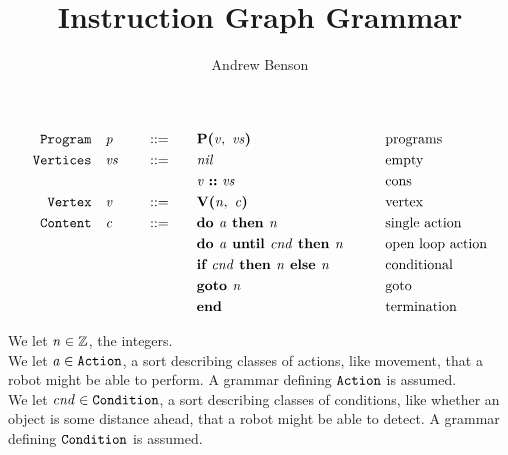 \documentclass[12pt]{article}
\title{Instruction Graph Grammar}
\author{Andrew Benson}
\date{}
\begin{document}
\maketitle

\thispagestyle{simple}

\begin{alignat*}{4}
  \mathtt{Program}\quad
    &\mathit{p}\quad & &::=\quad &
      &\textbf{P(}\mathit{v},\ \mathit{vs}\textbf{)}\qquad & &\text{programs}\\
  \mathtt{Vertices}\quad
    &\mathit{vs}\quad & &::=\quad &
      &\mathit{nil}\qquad & &\text{empty}\\
  &&&&&\mathit{v}\ \textbf{::}\ \mathit{vs}\qquad & &\text{cons}\\
  \mathtt{Vertex}\quad
    &\mathit{v}\quad & &::=\quad &
      &\textbf{V(}\mathit{n},\ \mathit{c}\textbf{)}\qquad & &\text{vertex}\\
  \mathtt{Content}\quad
    &\mathit{c}\quad & &::=\quad &
      &\textbf{do }\mathit{a}\textbf{ then }\mathit{n}\qquad & &\text{single action}\\
  &&&&&\textbf{do }\mathit{a}\textbf{ until }\mathit{cnd}\textbf{ then }\mathit{n}\qquad & &\text{open loop action}\\
  &&&&&\textbf{if }\mathit{cnd}\textbf{ then }\mathit{n}\textbf{ else }\mathit{n}\qquad & & \text{conditional}\\
  &&&&&\textbf{goto }\mathit{n}\qquad & &\text{goto}\\
  &&&&&\textbf{end}\qquad & &\text{termination}
\end{alignat*}

We let $\mathit{n} \in \mathbb{Z}$, the integers.\\

We let $\mathit{a} \in \mathtt{Action}$, a sort describing classes of actions,
like movement, that a robot might be able to perform. A grammar defining
$\mathtt{Action}$ is assumed.\\

We let $\mathit{cnd} \in \mathtt{Condition}$, a sort describing classes of
conditions, like whether an object is some distance ahead, that a robot might be
able to detect. A grammar defining $\mathtt{Condition}$ is assumed.\\
\end{document}
